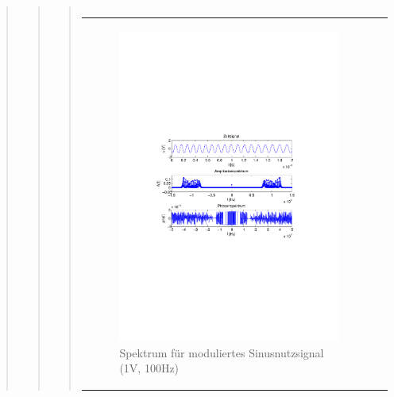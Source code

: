 \begin{quote}
\begin{quote}
\begin{quote}
\begin{center}
\begin{tabular}{ll}
            \end{tabular}
            \end{center}
        	
        	   
        	       \begin{center}
            \begin{tabular}{ll}

            \hspace{-10em}
                \begin{minipage}{0.6\textwidth}

                    \begin{figure}[H]
                        \label{fig:}
                        \includegraphics[scale=0.5, trim = 4cm 9.5cm 3.5cm
                        9.5cm, clip]{./Bilder/sin_a1_f100}
                        \caption{Spektrum für moduliertes Sinusnutzsignal (1V,
                        100Hz)}
                    \end{figure}


\end{minipage}
\end{tabular}
\end{center}
\end{quote}
\end{quote}
\end{quote}
